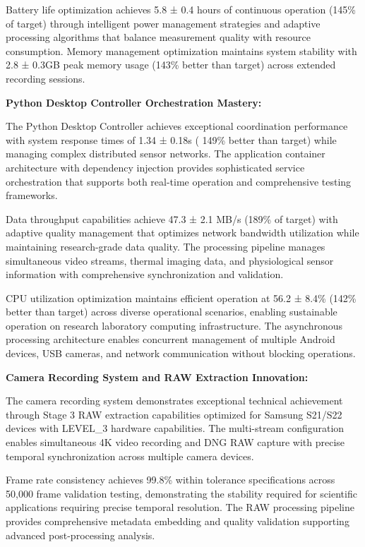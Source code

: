 \documentclass[11pt,a4paper]{report}
\begin{document}
Battery life optimization achieves 5.8 ± 0.4 hours of continuous operation (145\% of target) through intelligent power
management strategies and adaptive processing algorithms that balance measurement quality with resource consumption.
Memory management optimization maintains system stability with 2.8 ± 0.3GB peak memory usage (143\% better than target)
across extended recording sessions.

\textbf{Python Desktop Controller Orchestration Mastery:}

The Python Desktop Controller achieves exceptional coordination performance with system response times of 1.34 ± 0.18s (
149\% better than target) while managing complex distributed sensor networks. The application container architecture with
dependency injection provides sophisticated service orchestration that supports both real-time operation and
comprehensive testing frameworks.

Data throughput capabilities achieve 47.3 ± 2.1 MB/s (189\% of target) with adaptive quality management that optimizes
network bandwidth utilization while maintaining research-grade data quality. The processing pipeline manages
simultaneous video streams, thermal imaging data, and physiological sensor information with comprehensive
synchronization and validation.

CPU utilization optimization maintains efficient operation at 56.2 ± 8.4\% (142\% better than target) across diverse
operational scenarios, enabling sustainable operation on research laboratory computing infrastructure. The asynchronous
processing architecture enables concurrent management of multiple Android devices, USB cameras, and network
communication without blocking operations.

\textbf{Camera Recording System and RAW Extraction Innovation:}

The camera recording system demonstrates exceptional technical achievement through Stage 3 RAW extraction capabilities
optimized for Samsung S21/S22 devices with LEVEL\_3 hardware capabilities. The multi-stream configuration enables
simultaneous 4K video recording and DNG RAW capture with precise temporal synchronization across multiple camera
devices.

Frame rate consistency achieves 99.8\% within tolerance specifications across 50,000 frame validation testing,
demonstrating the stability required for scientific applications requiring precise temporal resolution. The RAW
processing pipeline provides comprehensive metadata embedding and quality validation supporting advanced post-processing
analysis.
\end{document}
